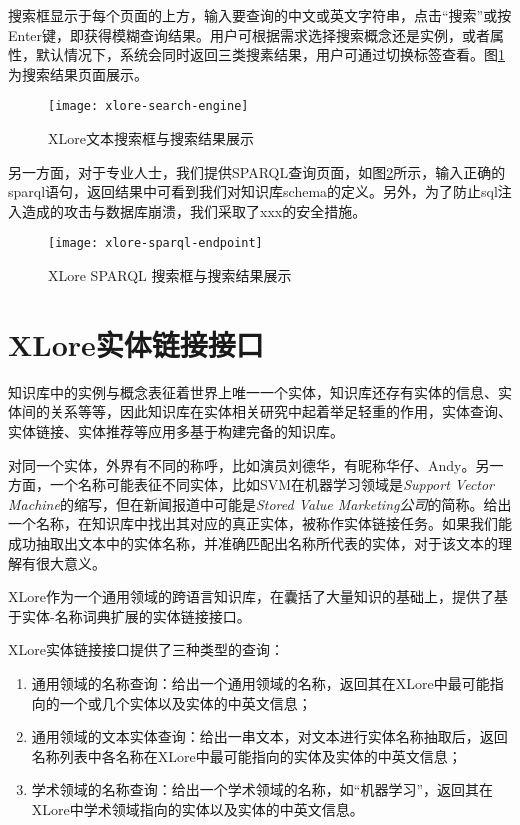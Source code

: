 搜索框显示于每个页面的上方，输入要查询的中文或英文字符串，点击“搜索”或按Enter键，即获得模糊查询结果。用户可根据需求选择搜索概念还是实例，或者属性，默认情况下，系统会同时返回三类搜素结果，用户可通过切换标签查看。图\ref{fig:xlore-search-engine}为搜索结果页面展示。

\begin{figure}[H] 
  \centering
  \texttt{[image: xlore-search-engine]}
  \caption{XLore文本搜索框与搜索结果展示}
  \label{fig:xlore-search-engine}
\end{figure}

另一方面，对于专业人士，我们提供SPARQL查询页面，如图\ref{fig:xlore-sparql-endpoint}所示，输入正确的sparql语句，返回结果中可看到我们对知识库schema的定义。另外，为了防止sql注入造成的攻击与数据库崩溃，我们采取了xxx的安全措施。

\begin{figure}[H] 
  \centering
  \texttt{[image: xlore-sparql-endpoint]}
  \caption{XLore SPARQL 搜索框与搜索结果展示}
  \label{fig:xlore-sparql-endpoint}
\end{figure}

\section{XLore实体链接接口}
\label{sec5:entity-linking-api}

知识库中的实例与概念表征着世界上唯一一个实体，知识库还存有实体的信息、实体间的关系等等，因此知识库在实体相关研究中起着举足轻重的作用，实体查询、实体链接、实体推荐等应用多基于构建完备的知识库。

对同一个实体，外界有不同的称呼，比如演员刘德华，有昵称华仔、Andy。另一方面，一个名称可能表征不同实体，比如SVM在机器学习领域是\textit{Support Vector Machine}的缩写，但在新闻报道中可能是\textit{Stored Value Marketing公司}的简称。给出一个名称，在知识库中找出其对应的真正实体，被称作{\heiti 实体链接}任务。如果我们能成功抽取出文本中的实体名称，并准确匹配出名称所代表的实体，对于该文本的理解有很大意义。

XLore作为一个通用领域的跨语言知识库，在囊括了大量知识的基础上，提供了基于实体-名称词典扩展的实体链接接口。

XLore实体链接接口提供了三种类型的查询：
\begin{enumerate}[1.]
\item 通用领域的名称查询：给出一个通用领域的名称，返回其在XLore中最可能指向的一个或几个实体以及实体的中英文信息；
\item 通用领域的文本实体查询：给出一串文本，对文本进行实体名称抽取后，返回名称列表中各名称在XLore中最可能指向的实体及实体的中英文信息；
\item 学术领域的名称查询：给出一个学术领域的名称，如“机器学习”，返回其在XLore中学术领域指向的实体以及实体的中英文信息。
\end{enumerate}

